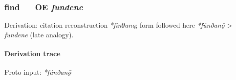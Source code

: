 \documentclass[
  british,
  a4paper,
]{article}
\begin{document}
\subsubsection{\texorpdfstring{find --- OE
\emph{fundene}}{find --- OE fundene}}\label{find-oe-fundene}

Derivation: citation reconstruction \emph{*fínθaną}; form followed here
\emph{*fúnðanǭ} \textgreater{} \emph{fundene} (late analogy).

\paragraph{Derivation trace}\label{derivation-trace-126}

Proto input: \emph{*fúnðanǭ}

\begingroup
\setlength{\fboxsep}{6pt}
\end{document}
